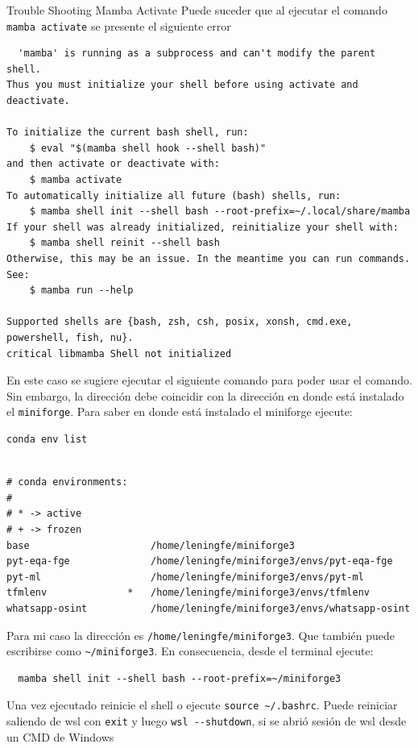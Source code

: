 \documentclass[presentation]{beamer}
\begin{document}
\begin{frame}{Trouble Shooting Mamba Activate}
 Puede suceder que al ejecutar el comando \texttt{mamba activate} se presente el siguiente error
\begin{verbatim}
  'mamba' is running as a subprocess and can't modify the parent shell.
Thus you must initialize your shell before using activate and deactivate.

To initialize the current bash shell, run:
    $ eval "$(mamba shell hook --shell bash)"
and then activate or deactivate with:
    $ mamba activate
To automatically initialize all future (bash) shells, run:
    $ mamba shell init --shell bash --root-prefix=~/.local/share/mamba
If your shell was already initialized, reinitialize your shell with:
    $ mamba shell reinit --shell bash
Otherwise, this may be an issue. In the meantime you can run commands. See:
    $ mamba run --help

Supported shells are {bash, zsh, csh, posix, xonsh, cmd.exe, powershell, fish, nu}.
critical libmamba Shell not initialized
\end{verbatim}

En este caso se sugiere ejecutar el siguiente comando para poder usar
el comando. Sin embargo, la dirección debe coincidir con la dirección
en donde está instalado el \texttt{miniforge}. Para saber en donde está
instalado el miniforge ejecute:
\begin{verbatim}
conda env list
\end{verbatim}

\begin{verbatim}

# conda environments:
#
# * -> active
# + -> frozen
base                     /home/leningfe/miniforge3
pyt-eqa-fge              /home/leningfe/miniforge3/envs/pyt-eqa-fge
pyt-ml                   /home/leningfe/miniforge3/envs/pyt-ml
tfmlenv              *   /home/leningfe/miniforge3/envs/tfmlenv
whatsapp-osint           /home/leningfe/miniforge3/envs/whatsapp-osint

\end{verbatim}

Para mi caso la dirección es \texttt{/home/leningfe/miniforge3}. Que también
puede escribirse como \texttt{\textasciitilde{}/miniforge3}. En consecuencia, desde el
terminal ejecute:
\begin{verbatim}
  mamba shell init --shell bash --root-prefix=~/miniforge3
\end{verbatim}

Una vez ejecutado reinicie el shell o ejecute \texttt{source
\textasciitilde{}/.bashrc}. Puede reiniciar saliendo de wsl con \texttt{exit} y luego \texttt{wsl
-{}-{}shutdown}, si se abrió sesión de wsl desde un CMD de Windows
\end{frame}
\end{document}

